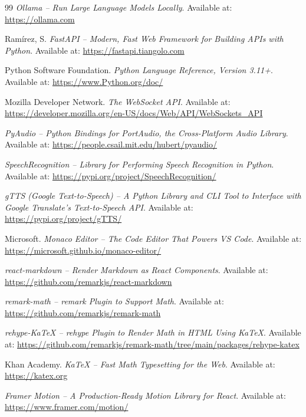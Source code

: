 \documentclass[a4paper,12pt]{article}
\begin{document}
\begin{thebibliography}{99}
\textit{Ollama -- Run Large Language Models Locally}.
Available at: \url{https://ollama.com}

Ram\'irez, S.
\textit{FastAPI -- Modern, Fast Web Framework for Building APIs with Python}.
Available at: \url{https://fastapi.tiangolo.com}

Python Software Foundation.
\textit{Python Language Reference, Version 3.11+}.
Available at: \url{https://www.Python.org/doc/}

Mozilla Developer Network.
\textit{The WebSocket API}.
Available at: \url{https://developer.mozilla.org/en-US/docs/Web/API/WebSockets_API}

\textit{PyAudio -- Python Bindings for PortAudio, the Cross-Platform Audio Library}.
Available at: \url{https://people.csail.mit.edu/hubert/pyaudio/}

\textit{SpeechRecognition -- Library for Performing Speech Recognition in Python}.
Available at: \url{https://pypi.org/project/SpeechRecognition/}

\textit{gTTS (Google Text-to-Speech) -- A Python Library and CLI Tool to Interface
with Google Translate's Text-to-Speech API}.
Available at: \url{https://pypi.org/project/gTTS/}

Microsoft.
\textit{Monaco Editor -- The Code Editor That Powers VS Code}.
Available at: \url{https://microsoft.github.io/monaco-editor/}

\textit{react-markdown -- Render Markdown as React Components}.
Available at: \url{https://github.com/remarkjs/react-markdown}

\textit{remark-math -- remark Plugin to Support Math}.
Available at: \url{https://github.com/remarkjs/remark-math}

\textit{rehype-KaTeX -- rehype Plugin to Render Math in HTML Using KaTeX}.
Available at: \url{https://github.com/remarkjs/remark-math/tree/main/packages/rehype-katex}

Khan Academy.
\textit{KaTeX -- Fast Math Typesetting for the Web}.
Available at: \url{https://katex.org}

\textit{Framer Motion -- A Production-Ready Motion Library for React}.
Available at: \url{https://www.framer.com/motion/}


\end{thebibliography}
\end{document}
